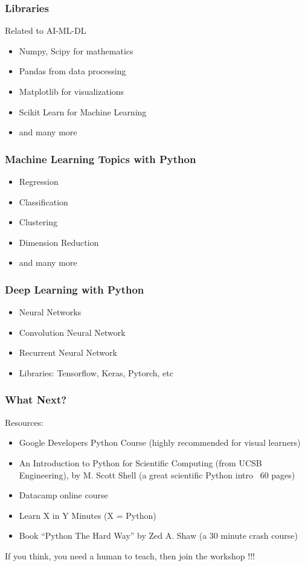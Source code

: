 \begin{frame}[fragile]\frametitle{Libraries}
Related to AI-ML-DL
\begin{itemize}
\item Numpy, Scipy for mathematics
\item Pandas from data processing
\item Matplotlib for visualizations
\item Scikit Learn for Machine Learning
\item and many more
\end{itemize}
\end{frame}

\begin{frame}[fragile]\frametitle{Machine Learning Topics with Python}
\begin{itemize}
\item Regression
\item Classification
\item Clustering
\item Dimension Reduction
\item and many more
\end{itemize}
\end{frame}

\begin{frame}[fragile]\frametitle{Deep Learning with Python}
\begin{itemize}
\item Neural Networks
\item Convolution Neural Network
\item Recurrent Neural Network
\item Libraries: Tensorflow, Keras, Pytorch, etc
\end{itemize}
\end{frame}

\begin{frame}[fragile]\frametitle{What Next?}
Resources:
\begin{itemize}
\item Google Developers Python Course (highly recommended for visual learners)
\item An Introduction to Python for Scientific Computing (from UCSB Engineering), by M. Scott Shell (a great scientific Python intro ~60 pages)
\item Datacamp online course
\item Learn X in Y Minutes (X = Python) 
\item Book ``Python The Hard Way'' by Zed A. Shaw (a 30 minute crash course)
\end{itemize}
If you think, you need a human to teach, then join the workshop !!!
\end{frame}